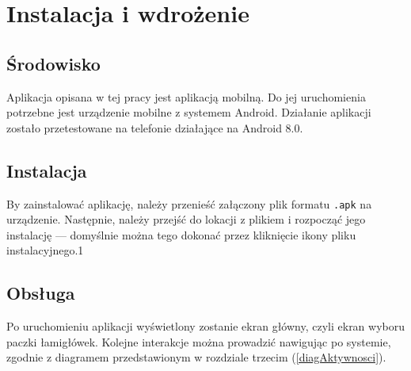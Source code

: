 \chapter{Instalacja i wdrożenie}
\thispagestyle{chapterBeginStyle}



\section{Środowisko}
    Aplikacja opisana w tej pracy jest aplikacją mobilną. Do jej uruchomienia potrzebne jest
urządzenie mobilne z systemem Android. Działanie aplikacji zostało przetestowane na telefonie
działające na Android 8.0.


\section{Instalacja}
    By zainstalować aplikację, należy przenieść załączony plik formatu \texttt{.apk} na urządzenie.
Następnie, należy przejść do lokacji z plikiem i rozpocząć jego instalację — domyślnie można
tego dokonać przez kliknięcie ikony pliku instalacyjnego.1


\section{Obsługa}
    Po uruchomieniu aplikacji wyświetlony zostanie ekran główny, czyli ekran wyboru paczki łamigłówek.
Kolejne interakcje można prowadzić nawigując po systemie, zgodnie z diagramem przedstawionym w
rozdziale trzecim (\ref{diagAktywnosci}).
